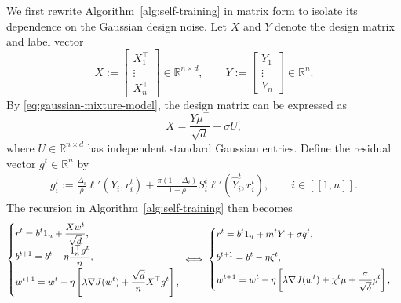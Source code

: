 We first rewrite Algorithm~\ref{alg:self-training} in matrix form
to isolate its dependence on the Gaussian design noise.
Let $X$ and $Y$ denote the design matrix and label vector
\[
    X
    :=
    \begin{bmatrix}
        X_1^\top\\
        \vdots\\
        X_n^\top
    \end{bmatrix}
    \in\mathbb R^{n\times d},
    \qquad
    Y:=
    \begin{bmatrix}
        Y_1 \\
        \vdots \\
        Y_n
    \end{bmatrix}
    \in\mathbb R^n.
\]
By \eqref{eq:gaussian-mixture-model}, the design matrix can be expressed as
\[
    X=\frac{Y\mu^\top}{\sqrt d}+\sigma U,
\]
where $U\in\mathbb R^{n\times d}$ has independent standard
Gaussian entries.
Define the residual vector $g^t\in\mathbb R^n$ by
\begin{align}
    g_i^t
    :=
    \frac{\Delta_i}{\rho}\ell'(Y_i,r_i^t)
    +
    \frac{\pi(1-\Delta_i)}{1-\rho}
        S_i^t\ell'(\widehat Y_i^t,r_i^t),
    \qquad i\in[\![1,n]\!].
    \label{eq:residual-map}
\end{align}
The recursion in Algorithm~\ref{alg:self-training} then becomes
\begin{align}
    \begin{cases}
    \displaystyle 
        r^t
        =
        b^t1_n+\frac{Xw^t}{\sqrt d},\\[5pt]
        \displaystyle 
        b^{t+1}
        =
        b^t-\eta\frac{1_n^\top g^t}{n},\\[5pt]
        \displaystyle 
        w^{t+1}
        =
        w^t-\eta\left[
            \lambda\nabla J(w^t)
            +\frac{\sqrt d}{n}X^\top g^t
        \right],
    \end{cases}
    \hspace{-10pt}
    \iff 
    \begin{cases}
    \displaystyle 
        r^t
        =
        b^t1_n+ m^t Y + \sigma q^t,\\[10pt]
        \displaystyle 
        b^{t+1}
        =
        b^t-\eta \zeta^t ,\\[5pt]
        \displaystyle 
        w^{t+1}
        =
        w^t-\eta\left[
            \lambda\nabla J(w^t)
            +
            \chi^t \mu 
            +\frac{\sigma}{\sqrt \delta} p^t
        \right],
    \end{cases}
    \label{eq:finite-dimensional-mean-field-iterations}
\end{align}
